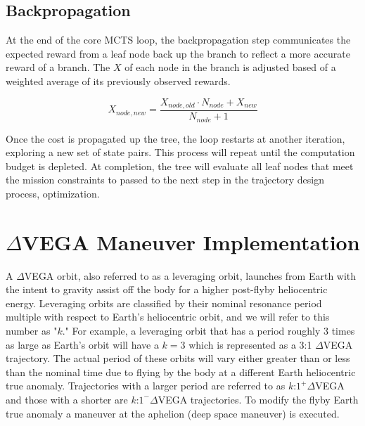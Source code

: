 \documentclass[letterpaper, preprint, paper,11pt]{AAS}	%
\begin{document}
\subsection{Backpropagation}

At the end of the core MCTS loop, the backpropagation step communicates the expected reward from a leaf node back up the branch to reflect a more accurate reward of a branch. The $X$ of each node in the branch is adjusted based of a weighted average of its previously observed rewards. 

\begin{equation}
    \label{eq:bp}
    X_{node, new} = \frac{X_{node, old} \cdot N_{node} + X_{new}}{N_{node} + 1}
\end{equation}

Once the cost is propagated up the tree, the loop restarts at another iteration, exploring a new set of state pairs. This process will repeat until the computation budget is depleted. At completion, the tree will evaluate all leaf nodes that meet the mission constraints to passed to the next step in the trajectory design process, optimization.

\section{$\Delta$VEGA Maneuver Implementation}

A $\Delta$VEGA orbit, also referred to as a leveraging orbit, launches from Earth with the intent to gravity assist off the body for a higher post-flyby heliocentric energy.  Leveraging orbits are classified by their nominal resonance period multiple with respect to Earth's heliocentric orbit, and we will refer to this number as "$k$." For example, a leveraging orbit that has a period roughly 3 times as large as Earth's orbit will have a $k=3$ which is represented as a 3:1 $\Delta$VEGA trajectory. The actual period of these orbits will vary either greater than or less than the nominal time due to flying by the body at a different Earth heliocentric true anomaly. Trajectories with a larger period are referred to as $k$:$1^{+} \Delta$VEGA and those with a shorter are $k$:$1^{-} \Delta$VEGA trajectories. To modify the flyby Earth true anomaly a maneuver at the aphelion (deep space maneuver) is executed.
\end{document}
